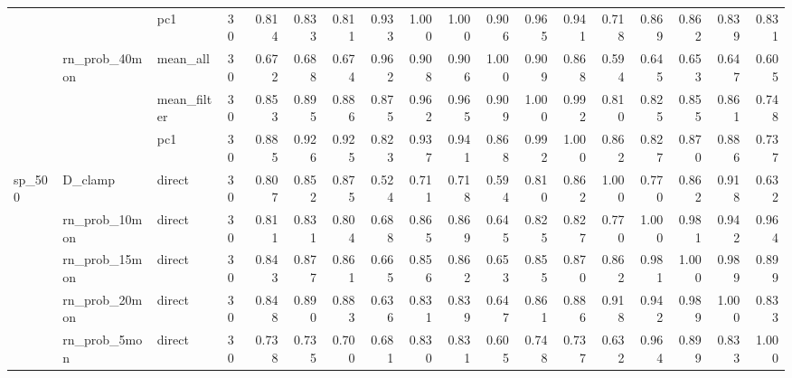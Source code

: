 \begin{tabular}{llllrrrrrrrrrrrrrr}
       &              & pc1 & 30 &    0.814 &       0.833 &  0.811 &         0.933 &       1.000 &  1.000 &         0.906 &       0.965 &  0.941 &   0.718 &         0.869 &         0.862 &         0.839 &        0.831 \\
       & rn\_prob\_40mon & mean\_all & 30 &    0.672 &       0.688 &  0.674 &         0.962 &       0.908 &  0.906 &         1.000 &       0.909 &  0.868 &   0.594 &         0.645 &         0.653 &         0.647 &        0.605 \\
       &              & mean\_filter & 30 &    0.853 &       0.895 &  0.886 &         0.875 &       0.962 &  0.965 &         0.909 &       1.000 &  0.992 &   0.810 &         0.825 &         0.855 &         0.861 &        0.748 \\
       &              & pc1 & 30 &    0.885 &       0.926 &  0.925 &         0.823 &       0.937 &  0.941 &         0.868 &       0.992 &  1.000 &   0.862 &         0.827 &         0.870 &         0.886 &        0.737 \\
sp\_500 & D\_clamp & direct & 30 &    0.807 &       0.852 &  0.875 &         0.524 &       0.711 &  0.718 &         0.594 &       0.810 &  0.862 &   1.000 &         0.770 &         0.862 &         0.918 &        0.632 \\
       & rn\_prob\_10mon & direct & 30 &    0.811 &       0.831 &  0.804 &         0.688 &       0.865 &  0.869 &         0.645 &       0.825 &  0.827 &   0.770 &         1.000 &         0.981 &         0.942 &        0.964 \\
       & rn\_prob\_15mon & direct & 30 &    0.843 &       0.877 &  0.861 &         0.665 &       0.856 &  0.862 &         0.653 &       0.855 &  0.870 &   0.862 &         0.981 &         1.000 &         0.989 &        0.899 \\
       & rn\_prob\_20mon & direct & 30 &    0.848 &       0.890 &  0.883 &         0.636 &       0.831 &  0.839 &         0.647 &       0.861 &  0.886 &   0.918 &         0.942 &         0.989 &         1.000 &        0.833 \\
       & rn\_prob\_5mon & direct & 30 &    0.738 &       0.735 &  0.700 &         0.681 &       0.830 &  0.831 &         0.605 &       0.748 &  0.737 &   0.632 &         0.964 &         0.899 &         0.833 &        1.000 \\
\bottomrule
\end{tabular}
